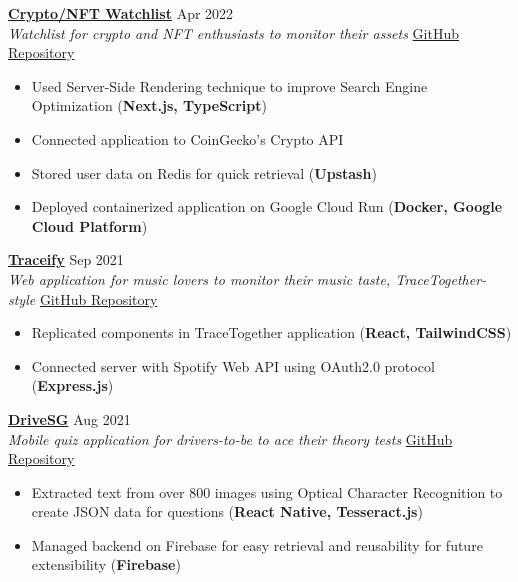 \documentclass[a4paper]{article}
\begin{document}
\textbf{\href{https://crypto-docker-nypoewfveq-uc.a.run.app/}{Crypto/NFT Watchlist}} \hfill Apr 2022\\
\textit{Watchlist for crypto and NFT enthusiasts to monitor their assets} \hfill \href{https://github.com/jianrong7/crypto-ts}{GitHub Repository}\\
\vspace{-2mm}
\begin{itemize} \itemsep 1pt
    \item Used Server-Side Rendering technique to improve Search Engine Optimization (\textbf{Next.js, TypeScript})
    \item Connected application to CoinGecko's Crypto API
    \item Stored user data on Redis for quick retrieval (\textbf{Upstash})
    \item Deployed containerized application on Google Cloud Run (\textbf{Docker, Google Cloud Platform})
\end{itemize}

\textbf{\href{https://traceify-client.netlify.app/}{Traceify}} \hfill Sep 2021\\
\textit{Web application for music lovers to monitor their music taste, TraceTogether-style} \hfill \href{https://github.com/jianrong7/traceify-client}{GitHub Repository}\\
\vspace{-2mm}
\begin{itemize} \itemsep 1pt
    \item Replicated components in TraceTogether application (\textbf{React, TailwindCSS})
    \item Connected server with Spotify Web API using OAuth2.0 protocol (\textbf{Express.js})
\end{itemize}

\textbf{\href{https://play.google.com/store/apps/details?id=com.jianrong7.drivesg}{DriveSG}} \hfill Aug 2021\\
\textit{Mobile quiz application for drivers-to-be to ace their theory tests} \hfill \href{https://github.com/jianrong7/drivesg}{GitHub Repository}\\
\vspace{-2mm}
\begin{itemize} \itemsep 1pt
    \item Extracted text from over 800 images using Optical Character Recognition to create JSON data for questions (\textbf{React Native, Tesseract.js})
    \item Managed backend on Firebase for easy retrieval and reusability for future extensibility (\textbf{Firebase})
\end{itemize}
\end{document}
